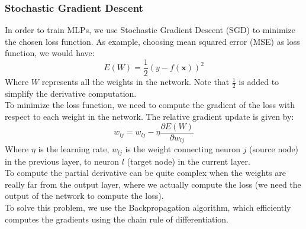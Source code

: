 \subsubsection{Stochastic Gradient Descent}
In order to train MLPs, we use Stochastic Gradient Descent (SGD) to minimize the chosen loss function. 
As example, choosing mean squared error (MSE) as loss function, we would have:
\[ E(W) = \frac{1}{2} (y - f(\boldsymbol{x}))^2 \]
Where $W$ represents all the weights in the network. Note that $\frac{1}{2}$ is added to simplify 
the derivative computation.
\\To minimize the loss function, we need to compute the gradient of the loss with respect to each weight in the network.
The relative gradient update is given by:
\[ w_{lj} = w_{lj} - \eta \frac{\partial E(W)}{\partial w_{lj}} \]
Where $\eta$ is the learning rate, $w_{lj}$ is the weight connecting neuron $j$ (source node) 
in the previous layer, to neuron $l$ (target node) in the current layer.
\\To compute the partial derivative can be quite complex when the weights are really far from the output layer, 
where we actually compute the loss (we need the output of the network to compute the loss).
\\To solve this problem, we use the Backpropagation algorithm, which efficiently computes the gradients using the chain rule of differentiation.

